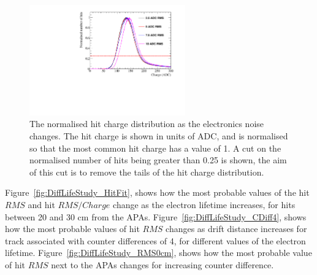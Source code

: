 \begin{figure}
  \centering
  \includegraphics[width=0.6\textwidth]{Canvas_ChargeCut_NoiseLevel}
  \caption[The normalised hit charge distribution as the electronics noise changes]
          {The normalised hit charge distribution as the electronics noise changes. The hit charge is shown in units of ADC, and is normalised so that the most common hit charge has a value of 1. A cut on the normalised number of hits being greater than 0.25 is shown, the aim of this cut is to remove the tails of the hit charge distribution.}
  \label{fig:DiffNoiseStudy_ChargeCut}
\end{figure}

Figure~\ref{fig:DiffLifeStudy_HitFit}, shows how the most probable values of the hit $RMS$ and hit $RMS/Charge$ change as the electron lifetime increases, for hits between 20 and 30 cm from the APAs. Figure~\ref{fig:DiffLifeStudy_CDiff4}, shows how the most probable values of hit $RMS$ changes as drift distance increases for track associated with counter differences of 4, for different values of the electron lifetime. Figure~\ref{fig:DiffLifeStudy_RMS0cm}, shows how the most probable value of hit $RMS$ next to the APAs changes for increasing counter difference. \\ 


